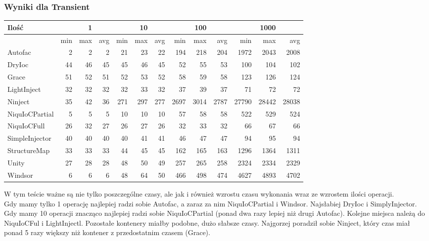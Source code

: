 \documentclass[12pt]{article}
\begin{document}
\subsubsection{Wyniki dla Transient}
\begin{center}
\begin{small}
	\begin{tabular}{ | l | r r r | r r r | r r r | r r r | }
    		\hline
     		Ilość & & 1 & & & 10 & & & 100 & & & 1000 & \\ \hline
     		 & min & max & avg & min & max & avg & min & max & avg & min & max & avg \\ \hline
    		Autofac & 2 & 2 & 2 & 21 & 23 & 22 & 194 & 218 & 204 & 1972 & 2043 & 2008 \\ \hline
		DryIoc & 44 & 46 & 45 & 45 & 46 & 45 & 52 & 55 & 53 & 100 & 104 & 102 \\ \hline
		Grace & 51 & 52 & 51 & 52 & 53 & 52 & 58 & 59 & 58 & 123 & 126 & 124 \\ \hline
		LightInject & 32 & 32 & 32 & 32 & 33 & 32 & 37 & 39 & 37 & 71 & 72 & 72 \\ \hline
		Ninject & 35 & 42 & 36 & 271 & 297 & 277 & 2697 & 3014 & 2787 & 27790 & 28442 & 28038 \\ \hline
		NiquIoCPartial & 5 & 5 & 5 & 10 & 10 & 10 & 57 & 58 & 58 & 522 & 529 & 524 \\ \hline
		NiquIoCFull & 26 & 32 & 27 & 26 & 27 & 26 & 32 & 33 & 32 & 66 & 67 & 66 \\ \hline
		SimpleInjector & 40 & 40 & 40 & 40 & 41 & 41 & 46 & 47 & 47 & 94 & 95 & 94 \\ \hline
		StructureMap & 33 & 33 & 33 & 44 & 45 & 45 & 162 & 165 & 163 & 1296 & 1364 & 1311 \\ \hline
		Unity & 27 & 28 & 28 & 48 & 50 & 49 & 257 & 265 & 258 & 2324 & 2334 & 2329 \\ \hline
		Windsor & 6 & 6 & 6 & 48 & 64 & 50 & 466 & 498 & 474 & 4627 & 4893 & 4702 \\
    		\hline
  	\end{tabular}
\end{small}
\end{center}
W tym teście ważne są nie tylko poszczególne czasy, ale jak i również wzrostu czasu wykonania wraz ze wzrostem ilości operacji.\\
Gdy mamy tylko 1 operację najlepiej radzi sobie Autofac, a zaraz za nim NiquIoCPartial i Windsor. Najsłabiej DryIoc i SimplyInjector.\\
Gdy mamy 10 operacji znacząco najlepiej radzi sobie NiquIoCPartial (ponad dwa razy lepiej niż drugi Autofac). Kolejne miejsca należą do NiquIoCFul i LightInjectl. Pozostałe kontenery miałby podobne, dużo słabsze czasy. Najgorzej poradził sobie Ninject, który czas miał ponad 5 razy większy niż kontener z przedostatnim czasem (Grace).\\
\end{document}
